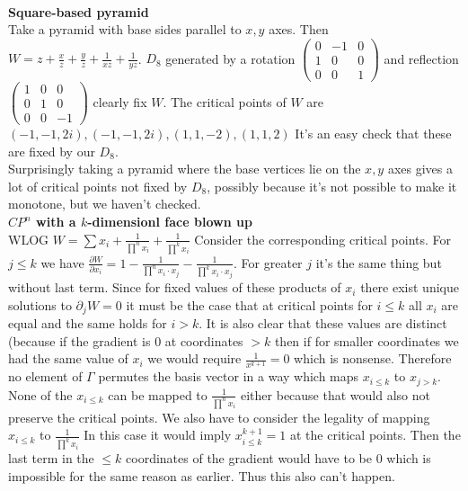 \documentclass[a4paper]{article}
\begin{document}
\\
 \textbf{Square-based pyramid}\\
 Take a pyramid with base sides parallel to $x,y$ axes. Then $W=z+\frac{x}{z}+\frac{y}{z}+\frac{1}{xz}+\frac{1}{yz}$. $D_8$ generated by a rotation  $\begin{pmatrix} 0 & -1 &0\\ 1 & 0 & 0\\ 0& 0 &1 \end{pmatrix} $ and reflection $\begin{pmatrix} 1 & 0 & 0 \\ 0 & 1 & 0\\ 0 & 0 &-1 \end{pmatrix} $ clearly fix $W$. The critical points of $W$ are $\left( -1,-1,2i \right) ,\left( -1,-1,2i \right), \left( 1,1,-2 \right),\left( 1,1,2 \right) $ 
 It's an easy check that these are fixed by our $D_8$.\\
 Surprisingly taking a pyramid where the base vertices lie on the  $x,y$ axes gives a lot of critical points not fixed by $D_8$, possibly because it's not possible to make it monotone, but we haven't checked.
 \\
\textbf{$CP^{n} $ with a $k$-dimensionl face blown up}
\\WLOG $W=\sum x_{i}+\frac{1}{\prod ^n x_{i}}+\frac{1}{\prod ^k x_{i}}$
Consider the corresponding critical points. For $j\le k$ we have $\frac{\partial W}{\partial x_{i}} =1-\frac{1}{\prod^n x_{i} \cdot  x_{j}} - \frac{1}{\prod^k x_{i} \cdot x_{j}}$. For greater $j$ it's the same thing but without last term. Since for fixed values of these products of $x_{i}$ there exist unique solutions to $\partial_j W=0$ it must be the case that at critical points for $i\le k$ all $x_{i}$ are equal and the same holds for $i>k$. It is also clear that these values are distinct (because if the gradient is 0 at coordinates $>k$ then if for smaller coordinates we had the same value of  $x_{i}$ we would require $\frac{1}{x^{k+1}}=0$ which is nonsense. Therefore no element of $\Gamma $ permutes the basis vector in a way which maps $x_{i\le k}$ to $x_{j>k}$. None of the $x_{i\le k}$ can be mapped to $\frac{1}{\prod^n x_{i}}$ either because that would also not preserve the critical points. 
We also have to consider the legality of mapping $x_{i\le k}$ to $\frac{1}{\prod^k x_{i}}$ In this case it would imply $x_{i\le k}^{k+1}=1$ at the critical points. Then the last term in the $\le k$ coordinates of the gradient would have to be 0 which is impossible for the same reason as earlier. Thus this also can't happen.
\end{document}
